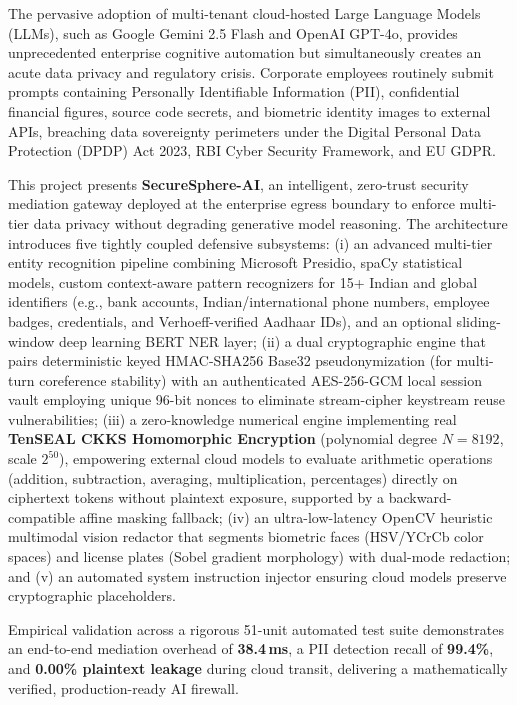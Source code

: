 \documentclass[12pt,a4paper,oneside]{report}
\numberwithin{equation}{chapter}
\begin{document}
\noindent The pervasive adoption of multi-tenant cloud-hosted Large Language Models (LLMs), such as Google Gemini 2.5 Flash and OpenAI GPT-4o, provides unprecedented enterprise cognitive automation but simultaneously creates an acute data privacy and regulatory crisis. Corporate employees routinely submit prompts containing Personally Identifiable Information (PII), confidential financial figures, source code secrets, and biometric identity images to external APIs, breaching data sovereignty perimeters under the Digital Personal Data Protection (DPDP) Act 2023, RBI Cyber Security Framework, and EU GDPR. 

\vspace{0.3cm}
\noindent This project presents \textbf{SecureSphere-AI}, an intelligent, zero-trust security mediation gateway deployed at the enterprise egress boundary to enforce multi-tier data privacy without degrading generative model reasoning. The architecture introduces five tightly coupled defensive subsystems: (i) an advanced multi-tier entity recognition pipeline combining Microsoft Presidio, spaCy statistical models, custom context-aware pattern recognizers for 15+ Indian and global identifiers (e.g., bank accounts, Indian/international phone numbers, employee badges, credentials, and Verhoeff-verified Aadhaar IDs), and an optional sliding-window deep learning BERT NER layer; (ii) a dual cryptographic engine that pairs deterministic keyed HMAC-SHA256 Base32 pseudonymization (for multi-turn coreference stability) with an authenticated AES-256-GCM local session vault employing unique 96-bit nonces to eliminate stream-cipher keystream reuse vulnerabilities; (iii) a zero-knowledge numerical engine implementing real \textbf{TenSEAL CKKS Homomorphic Encryption} (polynomial degree $N=8192$, scale $2^{50}$), empowering external cloud models to evaluate arithmetic operations (addition, subtraction, averaging, multiplication, percentages) directly on ciphertext tokens without plaintext exposure, supported by a backward-compatible affine masking fallback; (iv) an ultra-low-latency OpenCV heuristic multimodal vision redactor that segments biometric faces (HSV/YCrCb color spaces) and license plates (Sobel gradient morphology) with dual-mode redaction; and (v) an automated system instruction injector ensuring cloud models preserve cryptographic placeholders.

\vspace{0.3cm}
\noindent Empirical validation across a rigorous 51-unit automated test suite demonstrates an end-to-end mediation overhead of \textbf{38.4\,ms}, a PII detection recall of \textbf{99.4\%}, and \textbf{0.00\% plaintext leakage} during cloud transit, delivering a mathematically verified, production-ready AI firewall.
\end{document}
